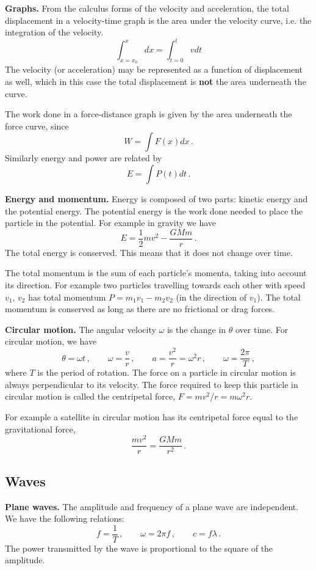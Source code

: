 \documentclass{article}
\begin{document}
\textbf{Graphs.} From the calculus forms of the velocity and acceleration, the total displacement in a velocity-time graph is the area under the velocity curve, i.e. the integration of the velocity.
\[
\int_{x=x_0}^x dx =\int_{t=0}^tvdt
\]
The velocity (or acceleration) may be represented as a function of displacement as well, which in this case the total displacement is \textbf{not} the area underneath the curve.

The work done in a force-distance graph is given by the area underneath the force curve, since
\[
W=\int F(x)dx\,.
\]
Similarly energy and power are related by
\[
E=\int P(t)dt\,.
\]

\textbf{Energy and momentum.} Energy is composed of two parts: kinetic energy and the potential energy. The potential energy is the work done needed to place the particle in the potential. For example in gravity we have
\[
E=\frac{1}{2}mv^2-\frac{GMm}{r}\,.
\]
The total energy is conserved. This means that it does not change over time.

The total momentum is the sum of each particle's momenta, taking into account its direction. For example two particles travelling towards each other with speed $v_1$, $v_2$ has total momentum $P=m_1v_1-m_2v_2$ (in the direction of $v_1$). The total momentum is conserved as long as there are no frictional or drag forces.

\textbf{Circular motion.} The angular velocity $\omega$ is the change in $\theta$ over time. For circular motion, we have
\[
\theta=\omega t\,,\qquad\omega=\frac{v}{r}\,,\qquad a=\frac{v^2}{r}=\omega^2r\,,\qquad \omega=\frac{2\pi}{T}\,,
\]
where $T$ is the period of rotation. The force on a particle in circular motion is always perpendicular to its velocity. The force required to keep this particle in circular motion is called the centripetal force, $F=mv^2/r = m\omega^2r$.

For example a satellite in circular motion has its centripetal force equal to the gravitational force,
\[
\frac{mv^2}{r}=\frac{GMm}{r^2}\,.
\]

\subsection{Waves}

\textbf{Plane waves.} The amplitude and frequency of a plane wave are independent. We have the following relations:
\[
f=\frac{1}{T}\,,\qquad\omega=2\pi f\,,\qquad c=f\lambda\,.
\]
The power transmitted by the wave is proportional to the square of the amplitude.
\end{document}

